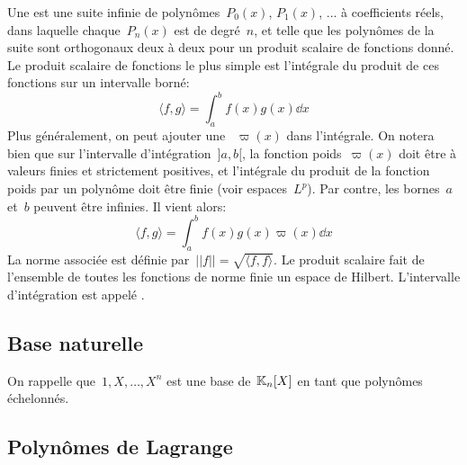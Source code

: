 Une  est une suite infinie de polynômes~$P_0(x)$, $P_1(x)$, ... à coefficients réels, dans laquelle chaque~$P_n(x)$ est de degré~$n$, et telle que les polynômes de la suite sont orthogonaux deux à deux pour un produit scalaire de fonctions donné. Le produit scalaire de fonctions le plus simple est l'intégrale du produit de ces fonctions sur un intervalle borné: 
\begin{equation}
\langle f,g \rangle=\int_a^b f(x)g(x)\dd x 
\end{equation}
Plus généralement, on peut ajouter une ~$\varpi(x)$ dans l'intégrale. On notera bien que sur l'intervalle d'intégration~$]a,b[$, la fonction poids~$\varpi(x)$ doit être à valeurs finies et strictement positives, et l'intégrale du produit de la fonction poids par un polynôme doit être finie (voir espaces~$L^p$). Par contre, les bornes~$a$ et~$b$ peuvent être infinies. Il vient alors: 
\begin{equation}
 \langle f,g \rangle=\int_a^b f(x)g(x)\varpi(x)\dd x 
\end{equation}
La norme associée est définie par~$||f||=\sqrt{\langle f,f \rangle}$. Le produit scalaire fait de l'ensemble de toutes les fonctions de norme finie un espace de Hilbert. L'intervalle d'intégration est appelé . 

\medskip
\subsection{Base naturelle} 

On rappelle que~$1,X,\ldots,X^n$ est une base de~$\mathbb K_n[X]$ en tant que polynômes échelonnés. 

\medskip
\subsection{Polynômes de Lagrange} 

